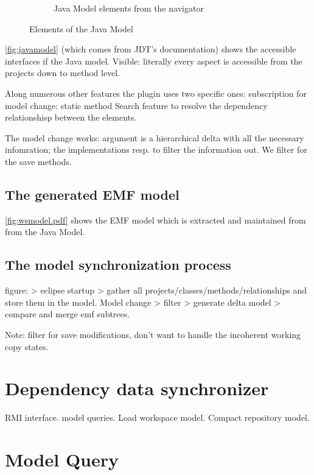 \begin{figure}
\begin{subfigure}[b]{0.5\textwidth}
                \caption{Java Model elements from the navigator}
                \label{fig:javamodel1.png}
        \end{subfigure}
        \caption{Elements of the Java Model}\label{fig:javamodel}
\end{figure}
\autoref{fig:javamodel} (which comes from JDT's documentation) shows the
accessible interfaces if the Java model. Visible: literally every aspect 
is accessible from the projects down to method level.

Along numerous other features the plugin uses two specific ones:
subscription for model change:
 static
method 
Search feature to resolve the dependency relationshisp between the elements.

The model change works: argument is a hierarchical delta with all the necessary infomration;
the implementations resp. to filter the information out.
We filter for the save methods.



\subsection{The generated EMF model}
\autoref{fig:wsmodel.pdf} shows the EMF model which is extracted and maintained from from the Java Model.

\subsection{The model synchronization process}

figure: > eclipse startup > gather all projects/classes/methods/relationships
and store them in the model.
Model change > filter > generate delta model > compare and merge emf subtrees.

Note: filter for save modifications, don't want to handle the incoherent working copy states. 


\section{Dependency data synchronizer}
RMI interface.
model queries.
Load workspace model.
Compact repository model.
 

\section{Model Query}

